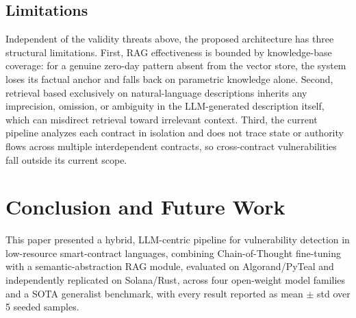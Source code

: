 \documentclass[lettersize,journal]{IEEEtran}
\begin{document}
\subsection{Limitations}
\label{sec:limitations}
Independent of the validity threats above, the proposed architecture has three structural
limitations. First, RAG effectiveness is bounded by knowledge-base coverage: for a genuine zero-day
pattern absent from the vector store, the system loses its factual anchor and falls back on
parametric knowledge alone. Second, retrieval based exclusively on natural-language descriptions
inherits any imprecision, omission, or ambiguity in the LLM-generated description itself, which can
misdirect retrieval toward irrelevant context. Third, the current pipeline analyzes each contract in
isolation and does not trace state or authority flows across multiple interdependent contracts, so
cross-contract vulnerabilities fall outside its current scope.

\section{Conclusion and Future Work}
\label{sec:conclusion}

This paper presented a hybrid, LLM-centric pipeline for vulnerability detection in low-resource
smart-contract languages, combining Chain-of-Thought fine-tuning with a semantic-abstraction RAG
module, evaluated on Algorand/PyTeal and independently replicated on Solana/Rust, across four
open-weight model families and a SOTA generalist benchmark, with every result reported as mean $\pm$
std over 5 seeded samples.
\end{document}

